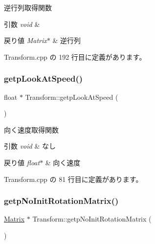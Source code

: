逆行列取得関数 


\begin{DoxyParams}{引数}
{\em void} & \\
\hline
\end{DoxyParams}

\begin{DoxyRetVals}{戻り値}
{\em Matrix$\ast$} & 逆行列 \\
\hline
\end{DoxyRetVals}


 Transform.\+cpp の 192 行目に定義があります。

\mbox{\label{class_transform_a812895ad4ebc4c713ece357167733418}} 
\subsubsection{\texorpdfstring{getp\+Look\+At\+Speed()}{getpLookAtSpeed()}}
{\footnotesize\ttfamily float $\ast$ Transform\+::getp\+Look\+At\+Speed (\begin{DoxyParamCaption}{ }\end{DoxyParamCaption})}



向く速度取得関数 


\begin{DoxyParams}{引数}
{\em void} & なし \\
\hline
\end{DoxyParams}

\begin{DoxyRetVals}{戻り値}
{\em float$\ast$} & 向く速度 \\
\hline
\end{DoxyRetVals}


 Transform.\+cpp の 81 行目に定義があります。

\mbox{\label{class_transform_a5d30e9aa1c2d1fff96996b6368a7f610}} 
\subsubsection{\texorpdfstring{getp\+No\+Init\+Rotation\+Matrix()}{getpNoInitRotationMatrix()}}
{\footnotesize\ttfamily \mbox{\hyperlink{class_matrix}{Matrix}} $\ast$ Transform\+::getp\+No\+Init\+Rotation\+Matrix (\begin{DoxyParamCaption}{ }\end{DoxyParamCaption})}



